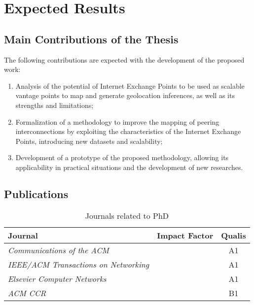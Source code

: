 \chapter{Expected Results}\label{cap:expected-results}
\thispagestyle{empty}

	\section{Main Contributions of the Thesis}\label{cap:contributions}
	\thispagestyle{empty}

	The following contributions are expected with the development of the proposed work:

	\begin{enumerate}
    \item Analysis of the potential of Internet Exchange Points to be used as scalable vantage points to map and generate geolocation inferences, as well as its strengths and limitations;

    \item Formalization of a methodology to improve the mapping of peering interconnections by exploiting the characteristics of the Internet Exchange Points, introducing new datasets and scalability;

    \item Development of a prototype of the proposed methodology, allowing its applicability in practical situations and the development of new researches.
    \end{enumerate}


	\section{Publications}
	\label{sec:publications}

	\begin{table}[htp]
	\centering
	\begin{tabularx}{\textwidth}{l | c | c}
	\hline \hline
	{\bf Journal}                                           & {\bf Impact Factor} & \textbf{Qualis} \\ \hline
    \textit{Communications of the ACM}                        &                   & A1 \\ \hline
	\textit{IEEE/ACM Transactions on Networking}              &                   & A1 \\ \hline
	\textit{Elsevier Computer Networks}                       &                   & A1 \\ \hline
	\textit{ACM CCR}                					      &                   & B1 \\ \hline
	

	\hline
	\end{tabularx}
	\caption{Journals related to PhD}
	\label{tbl:journals}
	\end{table}

